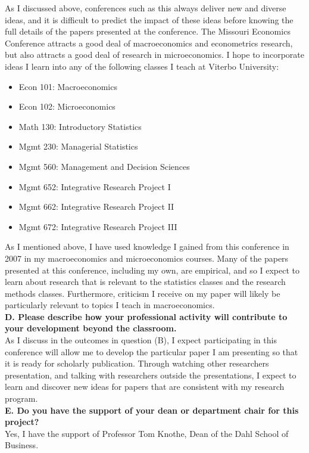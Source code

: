 \documentclass[12pt]{article}
\newcommand{\bi}{\begin{itemize}}
\newcommand{\ei}{\end{itemize}}
\begin{document}
As I discussed above, conferences such as this always deliver new and diverse ideas, and it is difficult to predict the impact of these ideas before knowing the full details of the papers presented at the conference.  The Missouri Economics Conference attracts a good deal of macroeconomics and econometrics research, but also attracts a good deal of research in microeconomics.  I hope to incorporate ideas I learn into any of the following classes I teach at Viterbo University:
\bi
\item Econ 101: Macroeconomics
\item Econ 102: Microeconomics
\item Math 130: Introductory Statistics
\item Mgmt 230: Managerial Statistics
\item Mgmt 560: Management and Decision Sciences
\item Mgmt 652: Integrative Research Project I
\item Mgmt 662: Integrative Research Project II
\item Mgmt 672: Integrative Research Project III
\ei

As I mentioned above, I have used knowledge I gained from this conference in 2007 in my macroeconomics and microeconomics courses.  Many of the papers presented at this conference, including my own, are empirical, and so I expect to learn about research that is relevant to the statistics classes and the research methods classes.  Furthermore, criticism I receive on my paper will likely be particularly relevant to topics I teach in macroeconomics.\\

\textbf{D. Please describe how your professional activity will contribute to your development beyond the classroom.} \\

As I discuss in the outcomes in question (B), I expect participating in this conference will allow me to develop the particular paper I am presenting so that it is ready for scholarly publication.  Through watching other researchers presentation, and talking with researchers outside the presentations, I expect to learn and discover new ideas for papers that are consistent with my research program. \\

\textbf{E. Do you have the support of your dean or department chair for this project?} \\
Yes, I have the support of Professor Tom Knothe, Dean of the Dahl School of Business. \\
\end{document}
